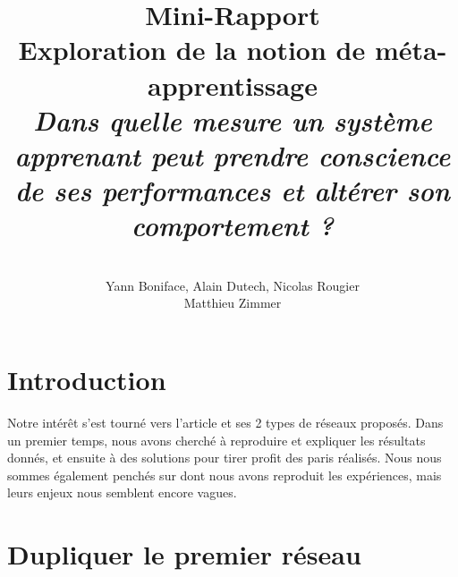 \documentclass[a4paper,12pt, twoside]{article}
\title{
  \textbf{Mini-Rapport}
  \\[5cm]
  Exploration de la notion de méta-apprentissage
  \\[3cm]
  \textit{
  Dans quelle mesure un système apprenant peut prendre conscience de ses performances
  et altérer son comportement ?}
}
\author{
  \\[3cm]
  Yann Boniface, Alain Dutech, Nicolas Rougier \\
  Matthieu Zimmer}
\begin{document}
\maketitle








\newpage
\section{Introduction}

Notre intérêt s'est tourné vers l'article \cite{Cleeremans_2007} et ses 2 types de réseaux proposés.
Dans un premier temps, nous avons cherché à reproduire et expliquer les résultats
donnés, et ensuite à des solutions pour tirer profit des paris réalisés.
\newline
Nous nous sommes également penchés sur \cite{Pasquali_2010} dont nous avons reproduit
les expériences, mais leurs enjeux nous semblent encore vagues.


\section{Dupliquer le premier réseau}
\end{document}
